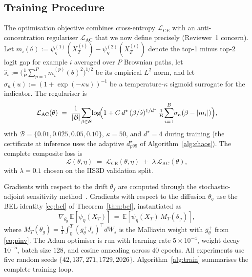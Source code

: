 \documentclass{ieeeaccess}
\newcommand{\Exp}{\mathbb{E}}
\newcommand{\Lcal}{\mathcal{L}}
\newcommand{\pinv}{{+}}   %
\begin{document}
\subsection{Training Procedure}\label{subsec:training}
The optimisation objective combines cross-entropy
$\Lcal_{\mathrm{CE}}$ with an anti-concentration regulariser
$\Lcal_{\mathrm{AC}}$ that we now define precisely (Reviewer~1 concern).
Let $m_i(\theta) := \psi_\eta^{(1)}(X_T^{(i)}) - \psi_\eta^{(2)}(X_T^{(i)})$
denote the top-1 minus top-2 logit gap for example $i$ averaged over
$P$ Brownian paths, let
$\hat s_i := \bigl(\tfrac{1}{P}\sum_{p=1}^P m_i^{(p)}(\theta)^2\bigr)^{1/2}$
be its empirical $L^{2}$ norm, and let
$\sigma_\kappa(u) := (1+\exp(-\kappa u))^{-1}$ be a temperature-$\kappa$
sigmoid surrogate for the indicator. The regulariser is
\begin{equation}\label{eq:ac-loss}
  \Lcal_{\mathrm{AC}}(\theta) \;=\; \frac{1}{|\mathcal B|}\!\sum_{\beta\in\mathcal B}\!
   \log\!\Bigl(1 + C\,d^\star\,(\beta / \hat s)^{1/d^\star}\,
                 \tfrac{1}{B}\!\sum_{i=1}^B\!\sigma_\kappa(\beta-|m_i|)\Bigr),
\end{equation}
with $\mathcal B=\{0.01,0.025,0.05,0.10\}$, $\kappa=50$, and
$d^\star=4$ during training (the certificate at inference uses the
adaptive $d^\star_{p99}$ of Algorithm~\ref{alg:chaos}). The complete
composite loss is
\begin{equation}\label{eq:loss}
  \Lcal(\theta,\eta) \;=\; \Lcal_{\mathrm{CE}}(\theta,\eta) \;+\;
   \lambda\,\Lcal_{\mathrm{AC}}(\theta),
\end{equation}
with $\lambda=0.1$ chosen on the IIS3D validation split.

Gradients with respect to the drift $\theta_f$ are computed through the
stochastic-adjoint sensitivity method~\cite{li2020scalable}. Gradients
with respect to the diffusion $\theta_g$ use the BEL identity
\eqref{eq:bel} of Theorem~\ref{thm:bel}, instantiated as
\begin{equation}\label{eq:bel-grad}
  \nabla_{\theta_g}\,\Exp[\psi_\eta(X_T)]
   \,=\,\Exp\!\left[\psi_\eta(X_T)\,M_T(\theta_g)\right],
\end{equation}
where $M_T(\theta_g) = \tfrac{1}{T}\int_0^T
(g_\theta^{\pinv} J_s)^\top dW_s$ is the Malliavin weight with
$g_\theta^{\pinv}$ from \eqref{eq:pinv}. The Adam optimiser is run
with learning rate $5\!\times\!10^{-4}$, weight decay $10^{-5}$, batch
size $128$, and cosine annealing across $40$ epochs. All experiments
use five random seeds $\{42,137,271,1729,2026\}$.
Algorithm~\ref{alg:train} summarises the complete training loop.
\end{document}
